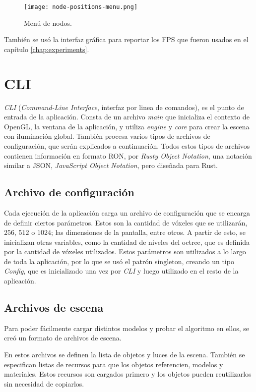 \begin{figure}
    \centering
    \texttt{[image: node-positions-menu.png]}
    \caption{Menú de nodos.}
    \label{fig:node-positions-menu}
\end{figure}

También se usó la interfaz gráfica para reportar los FPS que fueron usados en el capítulo \ref{chap:experiments}.

\section{CLI}

\textit{CLI} (\textit{Command-Line Interface}, interfaz por linea de comandos), es el punto de entrada de la aplicación.
Consta de un archivo \textit{main} que inicializa el contexto de OpenGL, la ventana de la aplicación, y utiliza \textit{engine} y \textit{core} para crear la escena con iluminación global.
También procesa varios tipos de archivos de configuración, que serán explicados a continuación.
Todos estos tipos de archivos contienen información en formato RON, por \textit{Rusty Object Notation}, una notación similar a JSON, \textit{JavaScript Object Notation}, pero diseñada para Rust.

\subsection{Archivo de configuración}

Cada ejecución de la aplicación carga un archivo de configuración que se encarga de definir ciertos parámetros.
Estos son la cantidad de vóxeles que se utilizarán, $256$, $512$ o $1024$; las dimensiones de la pantalla, entre otros.
A partir de esto, se inicializan otras variables, como la cantidad de niveles del octree, que es definida por la cantidad de vóxeles utilizados.
Estos parámetros son utilizados a lo largo de toda la aplicación, por lo que se usó el patrón singleton, creando un tipo \textit{Config}, que es inicializado una vez por \textit{CLI} y luego utilizado en el resto de la aplicación.

\subsection{Archivos de escena}

Para poder fácilmente cargar distintos modelos y probar el algoritmo en ellos, se creó un formato de archivos de escena.

En estos archivos se definen la lista de objetos y luces de la escena.
También se especifican listas de recursos para que los objetos referencien, modelos y materiales.
Estos recursos son cargados primero y los objetos pueden reutilizarlos sin necesidad de copiarlos.

